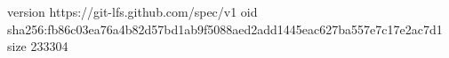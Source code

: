 version https://git-lfs.github.com/spec/v1
oid sha256:fb86c03ea76a4b82d57bd1ab9f5088aed2add1445eac627ba557e7c17e2ac7d1
size 233304
